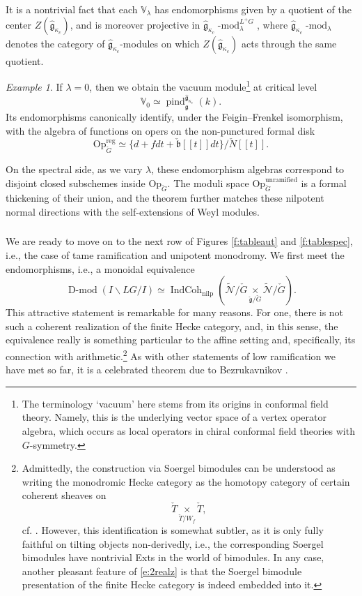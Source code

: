 \documentclass[10pt]{amsart}
\newcommand{\ICn}{\on{IndCoh}_{\on{nilp}}}
\newcommand{\fgc}{\widehat{\fg}_{\kappa_c}}
\newcommand{\cN}{\check{N}}
\newcommand{\Op}{\mathrm{Op}_{\cG}}
\newcommand{\gkc}{\gk_{\kappa_c}}
\newcommand{\fg}{\mathfrak{g}}
\newcommand{\on}{\operatorname}
\renewcommand{\mod}{\on{-mod}}
\newcommand{\Dmod}{\on{D-mod}}
\theoremstyle{remark}
\newtheorem{ex}[subsubsection]{Example}
\newcommand{\sN}{\mathscr{N}}
\newcommand{\fb}{\mathfrak{b}}
\newcommand{\gk}{\widehat{\fg}}
\numberwithin{equation}{section}
\newcommand{\cfg}{\check{\fg}}
\newcommand{\cG}{\check{G}}
\renewcommand{\mod}{\operatorname{-mod}}
\begin{document}
It is a nontrivial fact that each $\mathbb{V}_\lambda$ has endomorphisms given by a quotient of the center $Z(\fgc)$, and is moreover projective in $\gkc\mod^{L^+G}_\lambda$, where $\gkc\mod_\lambda$ denotes the category of $\gkc$-modules on which $Z(\fgc)$ acts through the same quotient. 


\begin{ex}\label{e:regop} If $\lambda = 0$, then we obtain the vacuum 
module\footnote{The 
terminology `vacuum' here stems from its origins in conformal field theory. 
Namely, this is the underlying vector space of a vertex operator algebra, which 
occurs as local operators in chiral conformal field theories with 
$G$-symmetry.} at 
critical level 
	\[
	  \mathbb{V}_0 \simeq \on{pind}_{\fg}^{\fgc}(k). 
	\]
Its endomorphisms canonically identify, under the Feigin--Frenkel isomorphism, 
with the algebra of functions on opers on the non-punctured formal disk
%
\[
    \Op^{\on{reg}} \simeq \{ d + f dt + \check{\fb}[[t]]dt \} / \cN[[t]].
\]
%
\end{ex}

On the spectral side, as we vary $\lambda$, these endomorphism algebras correspond to disjoint closed 
subschemes inside $\Op$. The moduli space $\Op^{\on{unramified}}$ is a formal thickening of their union, and the theorem further matches these nilpotent normal directions with the self-extensions of Weyl modules. 





\subsubsection{}\label{s:2realz} We are ready to move on to the next row of Figures \ref{f:tableaut} and \ref{f:tablespec}, i.e., 
the case of tame ramification and unipotent monodromy. We first meet the 
endomorphisms, i.e., a monoidal equivalence
%
\begin{equation} \label{e:2realz}
 \Dmod(I \backslash LG / I) \simeq \ICn( \widetilde{\sN} / \cG \underset {\cfg 
 / \cG} \times \widetilde{\sN} / \cG). 
\end{equation}
%
This attractive statement is remarkable for many reasons. For one, there is not 
such a coherent realization of the finite Hecke category, and, in this sense, the equivalence 
really is something particular to the affine setting and, specifically, its 
connection with arithmetic.\footnote{Admittedly, 
the construction via Soergel bimodules can be understood as writing the 
monodromic Hecke 
category as the homotopy category of certain coherent sheaves on $$\check{T} 
\underset 
{\check{T}/W_f}{\times} \check{T},$$cf. \cite{bezrichetop}. However, this identification is somewhat subtler, as it is 
only fully faithful on tilting objects non-derivedly, i.e., the corresponding 
Soergel bimodules have nontrivial Exts in the world of bimodules. In any case, 
another pleasant feature 
of \eqref{e:2realz} is that the Soergel bimodule presentation of the finite 
Hecke category is indeed embedded into it.} As with other statements of low ramification we 
have met so far, it is a celebrated theorem due to 
Bezrukavnikov \cite{bez2realz}. 
\end{document}

